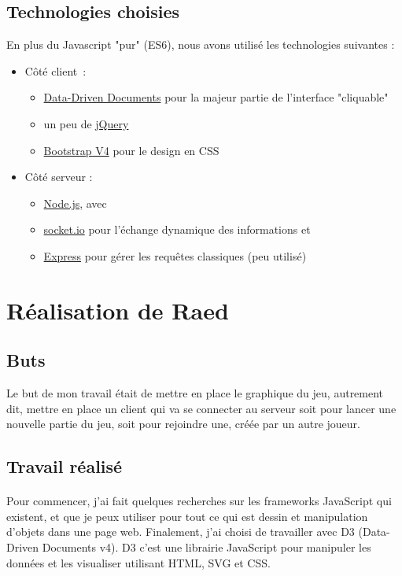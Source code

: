 \documentclass[a4paper, 11pt]{article}
\begin{document}
\subsection{Technologies choisies}
En plus du Javascript "pur" (ES6), nous avons utilisé les technologies suivantes :
\begin{itemize}
	\item Côté client :
	\begin{itemize}
		\item \href{https://d3js.org/}{Data-Driven Documents} pour la majeur partie de l'interface "cliquable"
		\item un peu de \href{https://jquery.org/}{jQuery}
		\item \href{http://getbootstrap.com/}{Bootstrap V4} pour le design en CSS
	\end{itemize}
	\item Côté serveur :
	\begin{itemize}
		\item \href{https://nodejs.org/en/}{Node.js}, avec
		\item \href{https://socket.io/}{socket.io} pour l'échange dynamique des informations et
		\item \href{http://expressjs.com/}{Express} pour gérer les requêtes classiques (peu utilisé)
	\end{itemize}
\end{itemize}

\section{Réalisation de Raed}
\subsection{Buts}
Le but de mon travail était de mettre en place le graphique du jeu, autrement dit, mettre en place un client qui va se connecter au serveur
soit pour lancer une nouvelle partie du jeu, soit pour rejoindre une, créée par un autre joueur.

\subsection{Travail réalisé}
\paragraph{} Pour commencer, j'ai fait quelques recherches sur les frameworks JavaScript qui existent, et que je peux utiliser pour tout ce qui est dessin et manipulation d'objets dans une page web. Finalement, j'ai choisi de travailler avec D3 (Data-Driven Documents v4). D3 c'est 
une librairie JavaScript pour manipuler les données et les visualiser utilisant HTML, SVG et CSS.
\end{document}
